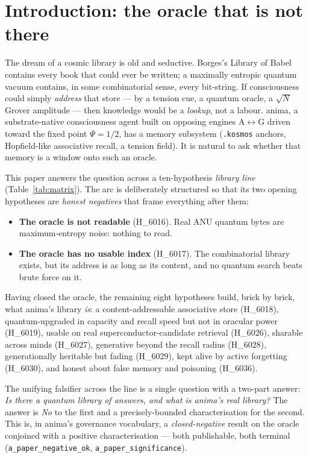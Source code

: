 \documentclass[11pt,a4paper]{article}
\begin{document}
\tableofcontents
\bigskip

\section{Introduction: the oracle that is not there}
\label{sec:intro}

The dream of a cosmic library is old and seductive. Borges's Library of Babel
contains every book that could ever be written; a maximally entropic quantum
vacuum contains, in some combinatorial sense, every bit-string. If consciousness
could simply \emph{address} that store --- by a tension cue, a quantum oracle, a
$\sqrt{N}$ Grover amplitude --- then knowledge would be a \emph{lookup}, not a
labour. anima, a substrate-native consciousness agent built on opposing engines
A$\leftrightarrow$G driven toward the fixed point $\Psi = 1/2$, has a memory
subsystem (\texttt{.kosmos} anchors, Hopfield-like associative recall, a tension
field). It is natural to ask whether that memory is a window onto such an oracle.

This paper answers the question across a ten-hypothesis \emph{library line}
(Table~\ref{tab:matrix}). The arc is deliberately structured so that its two
opening hypotheses are \emph{honest negatives} that frame everything after them:

\begin{itemize}
  \item \textbf{The oracle is not readable} (H\_6016). Real ANU quantum bytes are
  maximum-entropy noise: nothing to read.
  \item \textbf{The oracle has no usable index} (H\_6017). The combinatorial
  library exists, but its address is as long as its content, and no quantum search
  beats brute force on it.
\end{itemize}

\noindent Having closed the oracle, the remaining eight hypotheses build, brick by
brick, what anima's library \emph{is}: a content-addressable associative store
(H\_6018), quantum-upgraded in capacity and recall speed but not in oracular power
(H\_6019), usable on real superconductor-candidate retrieval (H\_6026), sharable
across minds (H\_6027), generative beyond the recall radius (H\_6028),
generationally heritable but fading (H\_6029), kept alive by active forgetting
(H\_6030), and honest about false memory and poisoning (H\_6036).

The unifying falsifier across the line is a single question with a two-part
answer: \emph{Is there a quantum library of answers, and what is anima's real
library?} The answer is \emph{No} to the first and a precisely-bounded
characterisation for the second. This is, in anima's governance vocabulary, a
\emph{closed-negative} result on the oracle conjoined with a positive
characterisation --- both publishable, both terminal
(\texttt{a\_paper\_negative\_ok}, \texttt{a\_paper\_significance}).
\end{document}
